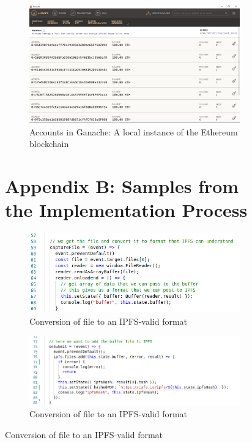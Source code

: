 \begin{figure}[H]
\begin{figure}[H]
\center
\includegraphics[scale=0.3]{images/ganache.png}
\caption{Accounts in Ganache: A local instance of the Ethereum blockchain}
\end{figure}

\section{Appendix B: Samples from the Implementation Process}

\begin{figure}[H]
\center
\includegraphics[scale=0.8]{images/codeconvert.png}
\caption{Conversion of file to an IPFS-valid format}
\end{figure}

\begin{figure}[H]
\includegraphics[scale=0.8]{images/codesubmit.png}
\caption{Conversion of file to an IPFS-valid format}
\end{figure}


\end{figure}
